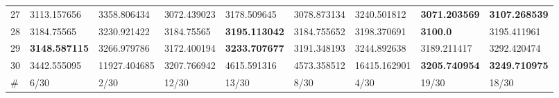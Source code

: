 \begin{table*}[b]
\begin{tabular}{|p{0.8cm}|p{1.6cm}|p{1.6cm}|p{1.6cm}|p{1.6cm}|p{1.6cm}|p{1.6cm}|p{1.6cm}|p{1.6cm}|}
27  & 3113.157656 & 3358.806434 & 3072.439023 & 3178.509645 & 3078.873134 & 3240.501812 & \textbf{3071.203569} & \textbf{3107.268539} \\ 
28  & 3184.75565 & 3230.921422 & 3184.75565 & \textbf{3195.113042} & 3184.755652 & 3198.370691 & \textbf{3100.0} & 3195.411961 \\ 
29  & \textbf{3148.587115} & 3266.979786 & 3172.400194 & \textbf{3233.707677} & 3191.348193 & 3244.892638 & 3189.211417 & 3292.420474 \\ 
30  & 3442.555095 & 11927.404685 & 3207.766942 & 4615.591316 & 4573.358512 & 16415.162901 & \textbf{3205.740954} & \textbf{3249.710975} \\
\hline
\#  & 6/30 & 2/30 & 12/30 & 13/30 & 8/30 & 4/30 & 19/30 & 18/30 \\
\hline

\end{tabular}
\end{table*}

